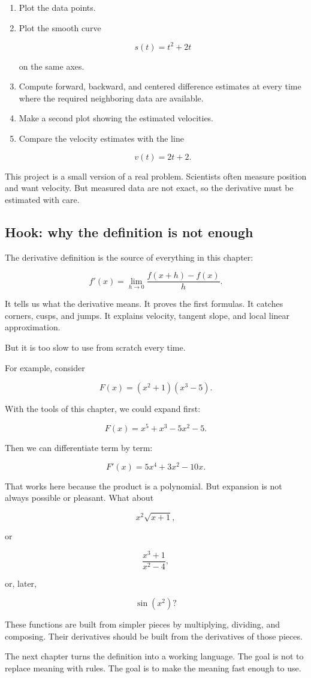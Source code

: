 \begin{enumerate}
\item Plot the data points.

\item Plot the smooth curve

\[
s(t)=t^2+2t
\]

on the same axes.

\item Compute forward, backward, and centered difference estimates at every time where the required neighboring data are available.

\item Make a second plot showing the estimated velocities.

\item Compare the velocity estimates with the line

\[
v(t)=2t+2.
\]
\end{enumerate}

This project is a small version of a real problem.  Scientists often measure position and want velocity.  But measured data are not exact, so the derivative must be estimated with care.

\subsection{Hook: why the definition is not enough}
\label{subsec:hook-definition-not-enough}

The derivative definition is the source of everything in this chapter:

\[
f'(x)=\lim_{h\to0}\frac{f(x+h)-f(x)}{h}.
\]

It tells us what the derivative means.  It proves the first formulas.  It catches corners, cusps, and jumps.  It explains velocity, tangent slope, and local linear approximation.

But it is too slow to use from scratch every time.

For example, consider

\[
F(x)=(x^2+1)(x^3-5).
\]

With the tools of this chapter, we could expand first:

\[
F(x)=x^5+x^3-5x^2-5.
\]

Then we can differentiate term by term:

\[
F'(x)=5x^4+3x^2-10x.
\]

That works here because the product is a polynomial.  But expansion is not always possible or pleasant.  What about

\[
x^2\sqrt{x+1},
\]

or

\[
\frac{x^3+1}{x^2-4},
\]

or, later,

\[
\sin(x^2)?
\]

These functions are built from simpler pieces by multiplying, dividing, and composing.  Their derivatives should be built from the derivatives of those pieces.

The next chapter turns the definition into a working language.  The goal is not to replace meaning with rules.  The goal is to make the meaning fast enough to use.
